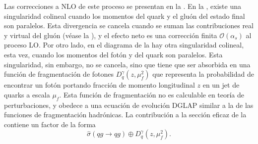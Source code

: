 Las correcciones a \ac{NLO} de este proceso se presentan en la \Fig{\ref{fig:theory:sm:prompt_photon:feynman_nlo_direct}}. En la \Fig{\ref{fig:theory:sm:prompt_photon:feynman_nlo_direct:gluon}}, existe una singularidad colineal cuando los momentos del quark y el gluón del estado final son paralelos. Esta divergencia se cancela cuando se suman las contribuciones real y virtual del gluón (véase la \Fig{\ref{fig:theory:sm:prompt_photon:feynman_nlo_direct:gluon_virtual}}), y el efecto neto es una corrección finita \(\mathcal{O}(\alpha_s)\) al proceso \ac{LO}. Por otro lado, en el diagrama de la \Fig{\ref{fig:theory:sm:prompt_photon:feynman_nlo_direct:photon}} hay otra singularidad colineal, esta vez, cuando los momentos del fotón y del quark son paralelos. Esta singularidad, sin embargo, no se cancela, sino que tiene que ser absorbida en una función de fragmentación de fotones \(D_q^{\gamma} (z, \mu^2_f )\) que representa la probabilidad de encontrar un fotón portando fracción de momento longitudinal \(z\) en un jet de quarks a escala \(\mu_f\). Esta función de fragmentación no es calculable en teoría de perturbaciones, y obedece a una ecuación de evolución DGLAP similar a la de las funciones de fragmentación hadrónicas. La contribución a la sección eficaz de la \Fig{\ref{fig:theory:sm:prompt_photon:feynman_nlo_direct:photon}} contiene un factor de la forma
\begin{equation}
    \label{eq:theory:sm:prompt_photon:fragmentation_contribution}
    \hat{\sigma}(qg \to qg) \oplus D_q^{\gamma} \left(z, \mu_f^2\right).
\end{equation}


